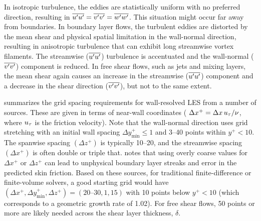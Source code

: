 
In isotropic turbulence, the eddies are statistically uniform with no
preferred direction, resulting in 
$\overline{u'u'}=
 \overline{v'v'}=
 \overline{w'w'}$.
%
This situation might occur far away from boundaries.
%
%
In boundary layer flows, the turbulent eddies are distorted by the mean shear
and physical spatial limitation in the wall-normal direction,
resulting in anisotropic turbulence that can exhibit long streamwise
vortex filaments.
%
The streamwise ($\overline{u'u'}$) turbulence is accentuated
and the wall-normal ($\overline{v'v'}$) component is reduced.
%
%
In free shear flows, such as jets and mixing layers, the mean shear
again causes an increase in the streamwise ($\overline{u'u'}$)
component and a decrease in the shear direction
($\overline{v'v'}$), but not to the same extent.
 

 summarizes the grid spacing requirements for
wall-resolved LES from a number of sources.
%
These are given in terms of near-wall coordinates (\thatis
$\Delta x^+ = \Delta x \, u_{\tau} / \nu$,
where $u_{\tau}$ is the friction velocity).
%
Note that the wall-normal direction uses grid stretching with an initial
wall spacing $\Delta y^+_\text{min} \leq 1$ and 3--40 points within
$y^+ < 10$.
%
The spanwise spacing $(\Delta z^+)$ is typically 10--20, and
the streamwise spacing $(\Delta x^+)$ is often double or triple that.
%
 notes that using overly coarse values for
$\Delta x^+$ or $\Delta z^+$ can lead to unphysical boundary layer streaks
and error in the predicted skin friction.
%
Based on these sources, for traditional finite-difference or finite-volume
solvers, a good starting grid would have
$(\Delta x^+, \Delta y^+_\text{min}, \Delta z^+) = (20\text{--}30,1,15)$
with 10 points below $y^+ < 10$
(which corresponds to a geometric growth rate of 1.02).
%
For free shear flows, 50 points or more are likely needed across the
shear layer thickness, $\delta$.
 
%
%

